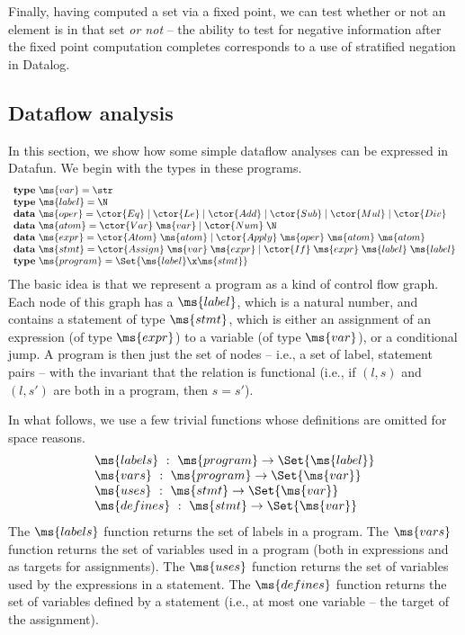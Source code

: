 Finally, having computed a set via a fixed point, we can test whether
or not an element is in that set \emph{or not} -- the ability to test
for negative information after the fixed point computation completes
corresponds to a use of stratified negation in Datalog.


\subsection{Dataflow analysis}
In this section, we show how some simple dataflow analyses can be expressed in
Datafun. We begin with the types in these programs.
\[\begin{array}{l}
\textbf{type}~\ms{var} = \str\\
\textbf{type}~\ms{label} = \N\\
\textbf{data}~\ms{oper} = \ctor{Eq} \pipe \ctor{Le}
\pipe \ctor{Add} \pipe \ctor{Sub} \pipe\ctor{Mul}\pipe\ctor{Div}\\
\textbf{data}~\ms{atom} = \ctor{Var}\;\ms{var} \pipe \ctor{Num}\;\N\\
\textbf{data}~\ms{expr} = \ctor{Atom}\;\ms{atom}
\pipe \ctor{Apply}\;\ms{oper}\;\ms{atom}\;\ms{atom}\\
\textbf{data}~\ms{stmt} =
\ctor{Assign} \;\ms{var} \;\ms{expr}
\pipe \ctor{If} \;\ms{expr} \;\ms{label}\;\ms{label} \\
\textbf{type}~\ms{program} = \Set{\ms{label} \x \ms{stmt}}
\end{array}\]
The basic idea is that we represent a program as a kind of control
flow graph. Each node of this graph has a $\ms{label}$, which is a
natural number, and contains a statement of type $\ms{stmt}$, which is
either an assignment of an expression (of type $\ms{expr}$) to a
variable (of type $\ms{var}$), or a conditional jump.  A program is
then just the set of nodes -- i.e., a set of label, statement pairs --
with the invariant that the relation is functional (i.e., if $(l, s)$
and $(l,s')$ are both in a program, then $s = s'$).

In what follows, we use a few trivial functions whose definitions are omitted
for space reasons.
\[\begin{array}{l}
\ms{labels} ~:~ \ms{program} \uto \Set{\ms{label}}\\
\ms{vars} ~:~ \ms{program} \uto \Set{\ms{var}}\\
\ms{uses} ~:~ \ms{stmt} \uto \Set{\ms{var}}\\
\ms{defines} ~:~ \ms{stmt} \uto \Set{\ms{var}}
\end{array}\]
The $\ms{labels}$ function returns the set of labels in a program. The
$\ms{vars}$ function returns the set of variables used in a program (both in
expressions and as targets for assignments). The $\ms{uses}$ function
returns the set of variables used by the expressions in a statement. The
$\ms{defines}$ function returns the set of variables defined by a statement
(i.e., at most one variable -- the target of the assignment).

